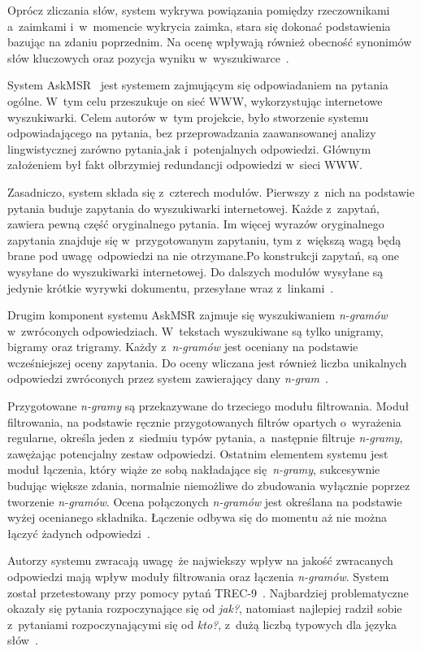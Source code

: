 Oprócz zliczania słów, system wykrywa powiązania pomiędzy rzeczownikami a~zaimkami i~w~momencie wykrycia zaimka, stara się dokonać podstawienia bazując na zdaniu poprzednim. Na ocenę wpływają również obecność synonimów słów kluczowych oraz pozycja wyniku w~wyszukiwarce~\cite{zheng2002answerbus}.

\label{askmr}
System AskMSR~\cite{brill2002analysis} jest systemem zajmującym się odpowiadaniem na pytania ogólne. W~tym celu przeszukuje on sieć WWW, wykorzystując internetowe wyszukiwarki. Celem autorów w~tym projekcie, było stworzenie systemu odpowiadającego na pytania, bez przeprowadzania zaawansowanej analizy lingwistycznej zarówno pytania,jak i~potenjalnych odpowiedzi. Głównym założeniem był fakt olbrzymiej redundancji odpowiedzi w~sieci WWW.

Zasadniczo, system składa się z~czterech modułów. Pierwszy z~nich na podstawie pytania buduje zapytania do wyszukiwarki internetowej. Każde z~zapytań, zawiera pewną część oryginalnego pytania. Im więcej wyrazów oryginalnego zapytania znajduje się w~przygotowanym zapytaniu, tym z~większą wagą będą brane pod uwagę odpowiedzi na nie otrzymane.Po konstrukcji zapytań, są one wysyłane do wyszukiwarki internetowej. Do dalszych modułów wysyłane są jedynie krótkie wyrywki dokumentu, przesyłane wraz z~linkami~\cite{brill2002analysis}.

Drugim komponent systemu AskMSR zajmuje się wyszukiwaniem \emph{n-gramów} w~zwróconych odpowiedziach. W~tekstach wyszukiwane są tylko unigramy, bigramy oraz trigramy. Każdy z~\emph{n-gramów} jest oceniany na podstawie wcześniejszej oceny zapytania. Do oceny wliczana jest również liczba unikalnych odpowiedzi zwróconych przez system zawierający dany \emph{n-gram}~\cite{brill2002analysis}.

Przygotowane \emph{n-gramy} są przekazywane do trzeciego modułu filtrowania. Moduł filtrowania, na podstawie ręcznie przygotowanych filtrów opartych o~wyrażenia regularne, określa jeden z~siedmiu typów pytania, a~następnie filtruje \emph{n-gramy}, zawężając potencjalny zestaw odpowiedzi. Ostatnim elementem systemu jest moduł łączenia, który wiąże ze sobą nakładające się \emph{n-gramy}, sukcesywnie budując większe zdania, normalnie niemożliwe do zbudowania wyłącznie poprzez tworzenie \emph{n-gramów}. Ocena połączonych \emph{n-gramów} jest określana na podstawie wyżej ocenianego składnika. Łączenie odbywa się do momentu aż nie można łączyć żadynch odpowiedzi~\cite{brill2002analysis}.

Autorzy systemu zwracają uwagę że najwiekszy wpływ na jakość zwracanych odpowiedzi mają wpływ moduły filtrowania oraz łączenia \emph{n-gramów}. System został przetestowany przy pomocy pytań TREC-9~\cite{voorhees2001trec}. Najbardziej problematyczne okazały się pytania rozpoczynające się od \emph{jak?}, natomiast najlepiej radził sobie z~pytaniami rozpoczynającymi się od \emph{kto?}, z~dużą liczbą typowych dla języka słów~\cite{brill2002analysis}.

